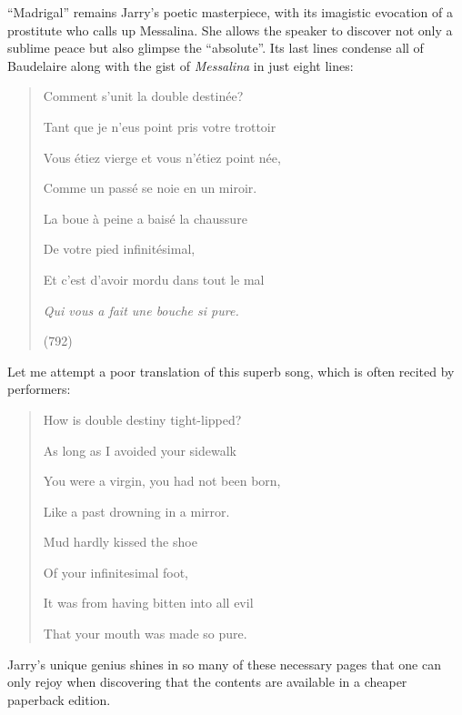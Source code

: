 \documentclass{article}
\begin{document}
\noindent ``Madrigal'' remains Jarry's poetic masterpiece, with its imagistic
evocation of a prostitute who calls up Messalina. She allows the speaker
to discover not only a sublime peace but also glimpse the ``absolute''.
Its last lines condense all of Baudelaire along with the gist of
\emph{Messalina} in just eight lines:

\begin{quote}
Comment s'unit la double destinée?

Tant que je n'eus point pris votre trottoir

Vous étiez vierge et vous n'étiez point née,

Comme un passé se noie en un miroir.

La boue à peine a baisé la chaussure

De votre pied infinitésimal,

Et c'est d'avoir mordu dans tout le mal

\emph{Qui vous a fait une bouche si pure.}
\begin{flushright}
    (792)   
\end{flushright}
\end{quote}

\noindent Let me attempt a poor translation of this superb song, which is often
recited by performers:
\begin{quote}
How is double destiny tight-lipped?

As long as I avoided your sidewalk

You were a virgin, you had not been born,

Like a past drowning in a mirror.

Mud hardly kissed the shoe

Of your infinitesimal foot,

It was from having bitten into all evil

That your mouth was made so pure.
\end{quote}

\noindent Jarry's unique genius shines in so many of these necessary pages that
one can only rejoy when discovering that the contents are available in a
cheaper paperback edition.


\begin{flushleft}
    \renewcommand*{\mkbibnamefamily}[1]{\textsc{#1}}
    \renewcommand*{\mkbibnamegiven}[1]{\textsc{#1}} 
\printbibliography
\end{flushleft}
\end{document}
